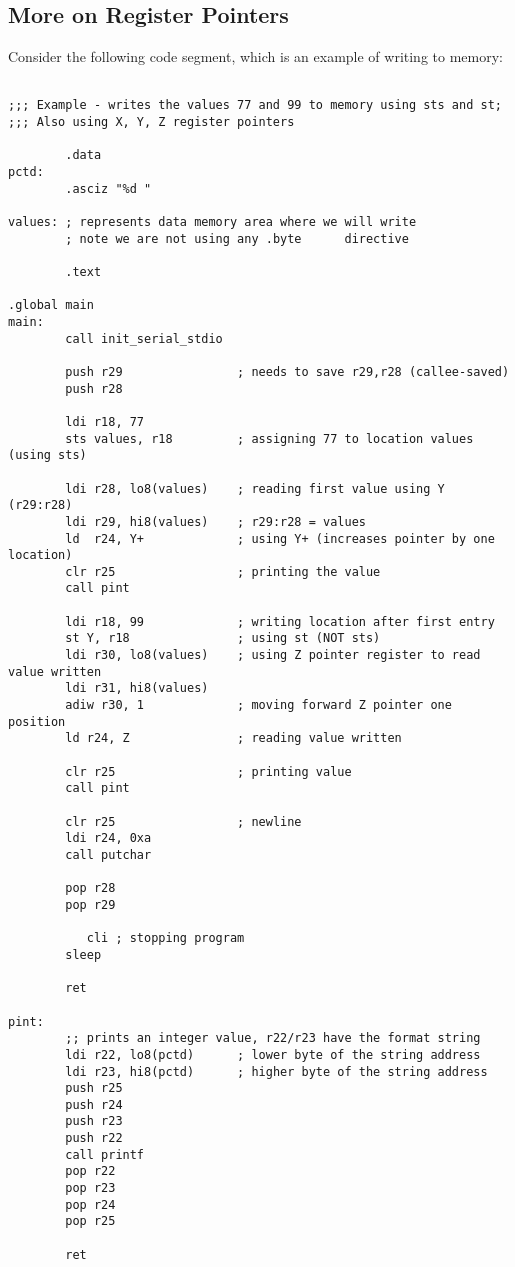 \subsection{More on Register Pointers}
Consider the following code segment, which is an example of writing to memory:


\lstset{
caption=Assembly: Register Pointers
}
\begin{lstlisting}

;;; Example - writes the values 77 and 99 to memory using sts and st; 
;;; Also using X, Y, Z register pointers

        .data
pctd:
        .asciz "%d "

values: ; represents data memory area where we will write
        ; note we are not using any .byte      directive

        .text

.global main
main:
        call init_serial_stdio

        push r29                ; needs to save r29,r28 (callee-saved)
        push r28

        ldi r18, 77
        sts values, r18         ; assigning 77 to location values (using sts)

        ldi r28, lo8(values)    ; reading first value using Y (r29:r28)
        ldi r29, hi8(values)    ; r29:r28 = values
        ld  r24, Y+             ; using Y+ (increases pointer by one location)
        clr r25                 ; printing the value
        call pint

        ldi r18, 99             ; writing location after first entry
        st Y, r18               ; using st (NOT sts)
        ldi r30, lo8(values)    ; using Z pointer register to read value written
        ldi r31, hi8(values)    
        adiw r30, 1             ; moving forward Z pointer one position
        ld r24, Z               ; reading value written

        clr r25                 ; printing value
        call pint

        clr r25                 ; newline
        ldi r24, 0xa
        call putchar

        pop r28
        pop r29

           cli ; stopping program
        sleep

        ret

pint:
        ;; prints an integer value, r22/r23 have the format string
        ldi r22, lo8(pctd)      ; lower byte of the string address
        ldi r23, hi8(pctd)      ; higher byte of the string address
        push r25
        push r24
        push r23
        push r22
        call printf
        pop r22
        pop r23
        pop r24
        pop r25

        ret
\end{lstlisting}


